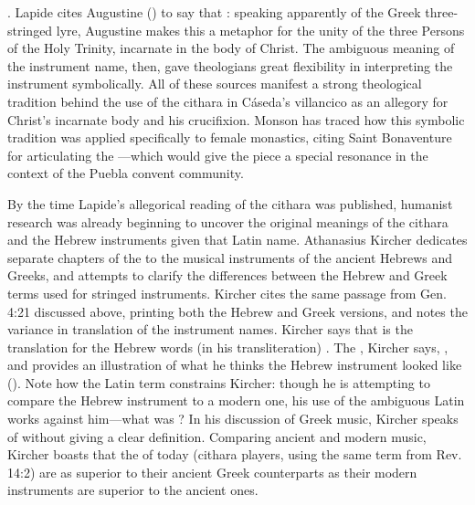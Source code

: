 .%
    \Autocite[370]{Lapide:1Samuel}
Lapide cites Augustine () to say that : speaking apparently of the Greek
three-stringed lyre, Augustine makes this a metaphor for the unity of the three
Persons of the Holy Trinity, incarnate in the body of Christ.%
    \Autocite[370]{Lapide:1Samuel}
The ambiguous meaning of the instrument name, then, gave theologians great
flexibility in interpreting the instrument symbolically.
All of these sources manifest a strong theological tradition behind the use of
the cithara in Cáseda's villancico as an allegory for Christ's incarnate body
and his crucifixion.  
Monson has traced how this symbolic tradition was applied specifically to
female monastics, citing Saint Bonaventure for articulating the
---which would give the piece a special resonance in the
context of the Puebla convent community.%
    \Autocite[93--94]{Monson:DivasConvent}

By the time Lapide's allegorical reading of the cithara was published, humanist
research was already beginning to uncover the original meanings of the cithara
and the Hebrew instruments given that Latin name.
Athanasius Kircher dedicates separate chapters of the  to the
musical instruments of the ancient Hebrews and Greeks, and attempts to clarify
the differences between the Hebrew and Greek terms used for stringed
instruments.
Kircher cites the same passage from Gen. 4:21 discussed above, printing both
the Hebrew and Greek versions, and notes the variance in translation of the
instrument names.
Kircher says that  is the translation for the Hebrew words (in
his transliteration) .
The , Kircher says, , and provides an illustration of what he thinks
the Hebrew instrument looked like ().%
    \autocite[, 44--49]{Kircher:Musurgia} 
Note how the Latin term constrains Kircher: though he is attempting to compare
the Hebrew instrument to a modern one, his use of the ambiguous Latin
 works against him---what was ?
In his discussion of Greek music, Kircher speaks of  without
giving a clear definition.
Comparing ancient and modern music, Kircher boasts that the
 of today (cithara players, using the same term from Rev.
14:2) are as superior to their ancient Greek counterparts as their modern
instruments are superior to the ancient ones.
    \Autocite[, 548]{Kircher:Musurgia}

